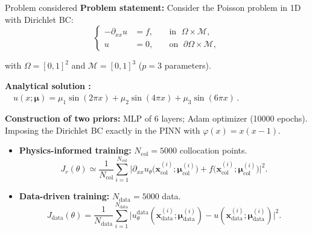 
\begin{appendixframe}{Problem considered}
	\textbf{Problem statement:} Consider the Poisson problem in 1D with Dirichlet BC:
	\vspace{-5pt}
	\begin{equation*}
		\left\{
		\begin{aligned}
			-\partial_{xx} u & = f, \; &  & \text{in } \; \Omega \times \mathcal{M}, \\
			u         & = 0, \;  &  & \text{on } \; \partial\Omega \times \mathcal{M},
		\end{aligned}
		\right.
	\end{equation*}

	\vspace{-5pt}
	with $\Omega=[0,1]^2$ and $\mathcal{M}=[0,1]^3$ ($p=3$ parameters).
		
	\vspace{4pt}
	\textbf{Analytical solution :} $\quad u(x;\bm{\mu})=\mu_1\sin(2\pi x)+\mu_2\sin(4\pi x)+\mu_3\sin(6\pi x) \,.$

	\vspace{4pt}
	\textbf{Construction of two priors:} MLP of 6 layers; Adam optimizer (10000 epochs). \\
	Imposing the Dirichlet BC exactly in the PINN with $\varphi(x)=x(x-1)$.

	\begin{itemize}
		\item \textbf{Physics-informed training:} $N_\text{col}=5000$ collocation points.
		$$J_r(\theta) \simeq
			\frac{1}{N_\text{col}} \sum_{i=1}^{N_\text{col}} \big| \partial_{xx}u_\theta(\bm{x}_\text{col}^{(i)};\bm{\mu}_\text{col}^{(i)}\big) + f\big(\bm{x}_\text{col}^{(i)};\bm{\mu}_\text{col}^{(i)}\big) \big|^2.$$
	
		\item \textbf{Data-driven training:}  $N_\text{data}=5000$ data.
		$$J_\text{data}(\theta) =
		\frac{1}{N_\text{data}}
		\sum_{i=1}^{N_\text{data}} \big| u_\theta^\text{data}(\bm{x}_\text{data}^{(i)};\bm{\mu}_\text{data}^{(i)}) - u(\bm{x}_\text{data}^{(i)};\bm{\mu}_\text{data}^{(i)}) \big|^2.$$
	\end{itemize}
\end{appendixframe}

